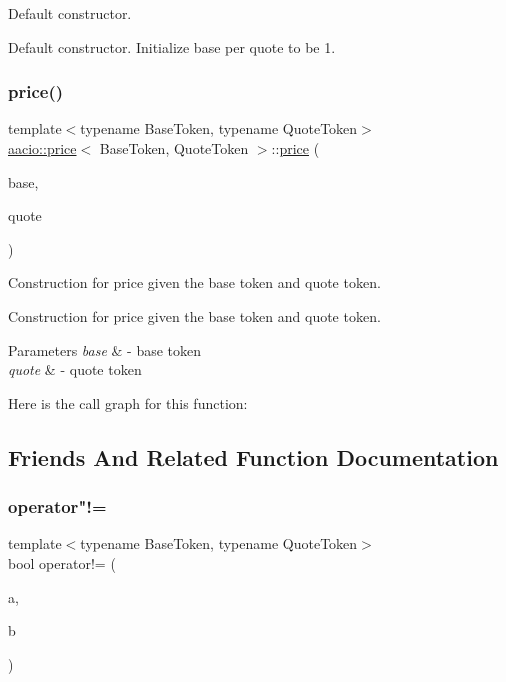 Default constructor. 

Default constructor. Initialize base per quote to be 1. \mbox{\label{structaacio_1_1price_abb8106fce4e7e287befe8e309abbb544}} 
\subsubsection{\texorpdfstring{price()}{price()}\hspace{0.1cm}{\footnotesize\ttfamily [2/2]}}
{\footnotesize\ttfamily template$<$typename Base\+Token, typename Quote\+Token$>$ \\
\mbox{\hyperlink{structaacio_1_1price}{aacio\+::price}}$<$ Base\+Token, Quote\+Token $>$\+::\mbox{\hyperlink{structaacio_1_1price}{price}} (\begin{DoxyParamCaption}\item[{Base\+Token}]{base,  }\item[{Quote\+Token}]{quote }\end{DoxyParamCaption})\hspace{0.3cm}{\ttfamily [inline]}}



Construction for price given the base token and quote token. 

Construction for price given the base token and quote token. 
\begin{DoxyParams}{Parameters}
{\em base} & -\/ base token \\
\hline
{\em quote} & -\/ quote token \\
\hline
\end{DoxyParams}
Here is the call graph for this function\+:


\subsection{Friends And Related Function Documentation}
\mbox{\label{structaacio_1_1price_afb4eb2338acf95c043151f4f35b99432}} 
\subsubsection{\texorpdfstring{operator"!=}{operator!=}}
{\footnotesize\ttfamily template$<$typename Base\+Token, typename Quote\+Token$>$ \\
bool operator!= (\begin{DoxyParamCaption}\item[{const \mbox{\hyperlink{structaacio_1_1price}{price}}$<$ Base\+Token, Quote\+Token $>$ \&}]{a,  }\item[{const \mbox{\hyperlink{structaacio_1_1price}{price}}$<$ Base\+Token, Quote\+Token $>$ \&}]{b }\end{DoxyParamCaption})\hspace{0.3cm}{\ttfamily [friend]}}



